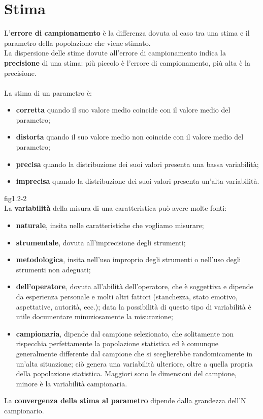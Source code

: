 \documentclass[drafts, 10pt]{book}
\begin{document}
\section{Stima}
L'\textbf{errore di campionamento} è la differenza dovuta al caso tra una stima e il parametro della popolazione che viene stimato.
\\
La dispersione delle stime dovute all'errore di campionamento indica la \textbf{precisione} di una stima: più piccolo è l'errore di campionamento, più alta è la precisione.
\\
\\
La stima di un parametro è:
\begin{itemize}
    \item \textbf{corretta} quando il suo valore medio coincide con il valore medio del parametro;
    \item \textbf{distorta} quando il suo valore medio non coincide con il valore medio del parametro;
    \item \textbf{precisa} quando la distribuzione dei suoi valori presenta una bassa variabilità;
    \item \textbf{imprecisa} quando la distribuzione dei suoi valori presenta un’alta variabilità.
\end{itemize}
fig1.2-2 \label{fig1.2-2} %
\\
La \textbf{variabilità} della misura di una caratteristica può avere molte fonti:
\begin{itemize}
    \item \textbf{naturale}, insita nelle caratteristiche che vogliamo misurare; 
    \item \textbf{strumentale}, dovuta all’imprecisione degli strumenti; 
    \item \textbf{metodologica}, insita nell’uso improprio degli strumenti o nell’uso degli strumenti non adeguati; 
    \item \textbf{dell’operatore}, dovuta all’abilità dell’operatore, che è soggettiva e dipende da esperienza personale e molti altri fattori (stanchezza, stato emotivo, aspettative, autorità, ecc.); data la possibilità di questo tipo di variabilità è utile documentare minuziosamente la misurazione;
    \item \textbf{campionaria}, dipende dal campione selezionato, che solitamente non rispecchia perfettamente la popolazione statistica ed è comunque generalmente differente dal campione che si sceglierebbe randomicamente in un’alta situazione; ciò genera una variabilità ulteriore, oltre a quella propria della popolazione statistica. Maggiori sono le dimensioni del campione, minore è la variabilità campionaria.
\end{itemize}
La \textbf{convergenza della stima al parametro} dipende dalla grandezza dell’N campionario.
\end{document}
